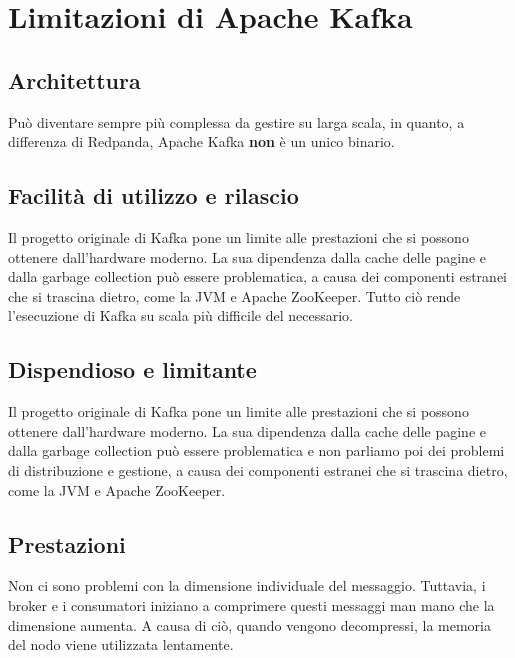 \section{Limitazioni di Apache Kafka}
\subsection{Architettura}
Può diventare sempre più complessa da gestire su larga scala, in quanto, a differenza di Redpanda, Apache Kafka \textbf{non} è un unico binario.
\subsection{Facilità di utilizzo e rilascio}
Il progetto originale di Kafka pone un limite alle prestazioni che si possono ottenere dall'hardware moderno. La sua dipendenza dalla cache delle pagine e dalla garbage collection può essere problematica, a causa dei componenti estranei che si trascina dietro, come la JVM e Apache ZooKeeper.
Tutto ciò rende l'esecuzione di Kafka su scala più difficile del necessario.
\subsection{Dispendioso e limitante}
Il progetto originale di Kafka pone un limite alle prestazioni che si possono ottenere dall'hardware moderno. La sua dipendenza dalla cache delle pagine e dalla garbage collection può essere problematica e non parliamo poi dei problemi di distribuzione e gestione, a causa dei componenti estranei che si trascina dietro, come la JVM e Apache ZooKeeper.
\subsection{Prestazioni}
Non ci sono problemi con la dimensione individuale del messaggio. Tuttavia, i broker e i consumatori iniziano a comprimere questi messaggi man mano che la dimensione aumenta. A causa di ciò, quando vengono decompressi, la memoria del nodo viene utilizzata lentamente.



